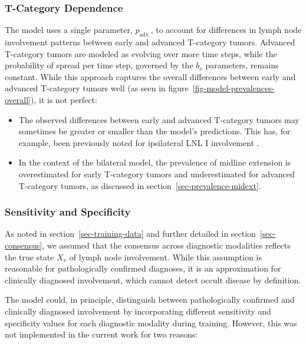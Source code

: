 \documentclass[
  sn-mathphys-num,
]{sn-jnl}
\providecommand{\tightlist}{%
  \setlength{\itemsep}{0pt}\setlength{\parskip}{0pt}}\usepackage{longtable,booktabs,array}
\begin{document}
\subsubsection{T-Category Dependence}\label{t-category-dependence}

The model uses a single parameter, \(p_\text{adv.}\), to account for
differences in lymph node involvement patterns between early and
advanced T-category tumors. Advanced T-category tumors are modeled as
evolving over more time steps, while the probability of spread per time
step, governed by the \(b_v\) parameters, remains constant. While this
approach captures the overall differences between early and advanced
T-category tumors well (as seen in
figure~\ref{fig-model-prevalences-overall}), it is not perfect:

\begin{itemize}
\tightlist
\item
  The observed differences between early and advanced T-category tumors
  may sometimes be greater or smaller than the model's predictions. This
  has, for example, been previously noted for ipsilateral LNL I
  involvement \citep{ludwig_modelling_2023}.
\item
  In the context of the bilateral model, the prevalence of midline
  extension is overestimated for early T-category tumors and
  underestimated for advanced T-category tumors, as discussed in
  section~\ref{sec-prevalence-midext}.
\end{itemize}

\subsubsection{Sensitivity and
Specificity}\label{sensitivity-and-specificity}

As noted in section~\ref{sec-training-data} and further detailed in
section~\ref{sec-consensus}, we assumed that the consensus across
diagnostic modalities reflects the true state \(X_v\) of lymph node
involvement. While this assumption is reasonable for pathologically
confirmed diagnoses, it is an approximation for clinically diagnosed
involvement, which cannot detect occult disease by definition.

The model could, in principle, distinguish between pathologically
confirmed and clinically diagnosed involvement by incorporating
different sensitivity and specificity values for each diagnostic
modality during training. However, this was not implemented in the
current work for two reasons:
\end{document}
